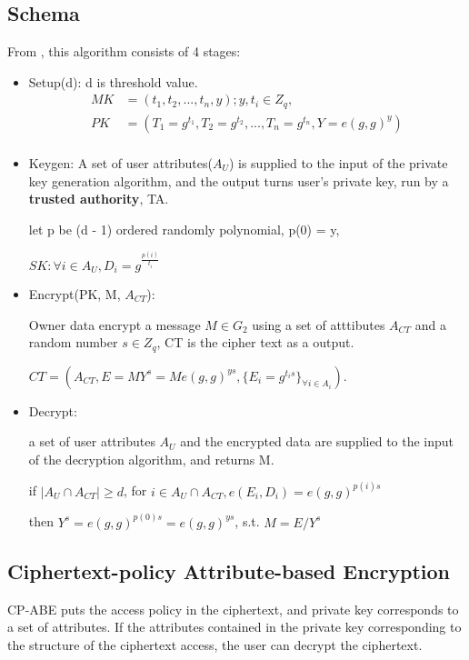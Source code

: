 \documentclass[a4paper,11pt]{article}
\begin{document}
\subsection{Schema}
From \cite{s1} ,   this algorithm consists of 4 stages: 
\begin {itemize}
\item Setup(d):  d is threshold value.
  \begin{equation} 
  \begin{split}
  	MK &= (t_1, t_2, ... , t_n, y);  y, t_i \in Z_q,  \\
	PK &= (T_1=g^{t_1}, T_2=g^{t_2}, ...,T_n=g^{t_n}, Y = e(g, g)^y)  \\
  \end{split}
  \end{equation}
\item Keygen:  A set of user attributes($A_U$) is supplied to the input of the private key generation algorithm, and the output turns user's private key, run by a \textbf{trusted authority}, TA. 

let p be (d - 1) ordered randomly polynomial, p(0) = y,

$SK: \forall i \in A_U, {D_i = g^{\frac{p(i)}{t_i}}} $

\item Encrypt(PK, M, $A_{CT}$):

Owner data encrypt a message $M \in G_2$ using a set of atttibutes $A_{CT}$ and a random number $s \in Z_q$, CT is the cipher text as a output.

$CT  =  (A_{CT}, E=MY^s=Me(g, g)^{ys}, \{ E_i = g^{t_{i}s}\}_{\forall i \in A_i})$.

\item Decrypt:

a set of user attributes $A_U$ and the encrypted data are supplied to the input of the decryption algorithm, and returns M. 

if $|A_U \cap A_{CT}| \ge d$, for $i \in A_U \cap A_{CT}, e(E_i, D_i) = e(g, g)^{p(i)s}$

then $Y^s = e(g, g)^{p(0)s}  = e(g, g)^{ys}$,  s.t.  $M = E/{Y^s}$ 

\end {itemize}

\subsection {Ciphertext-policy Attribute-based Encryption}

CP-ABE puts the access policy in the ciphertext, and private key corresponds to  a set of attributes. If the attributes contained in the private key corresponding to the structure of the ciphertext access, the user can decrypt the ciphertext. 
\end{document}
